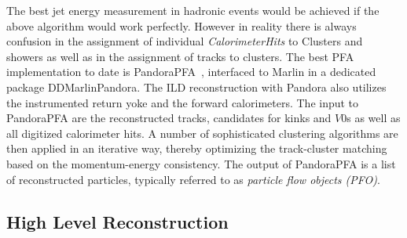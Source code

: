  The best jet energy measurement in hadronic events would be achieved if the above algorithm would work perfectly. However in reality
 there is always confusion in the assignment of individual \emph{CalorimeterHits} to Clusters and showers as well as in the assignment
 of tracks to clusters. The best PFA implementation to date is PandoraPFA~\cite{Marshall:2015rfa},  interfaced to Marlin in a dedicated package
 DDMarlinPandora. The ILD reconstruction with Pandora also utilizes the instrumented return yoke and the forward calorimeters.
 The input to PandoraPFA are the reconstructed tracks, candidates for  kinks and  $V0$s as well as all digitized calorimeter hits.
 A number of sophisticated clustering algorithms are then applied in an iterative way, thereby optimizing the track-cluster matching
 based on the momentum-energy consistency. The output of PandoraPFA is a list of reconstructed particles, typically referred to as
 \emph{particle flow objects (PFO)}.

\subsection{\label{sec:model:hlr} High Level Reconstruction}

